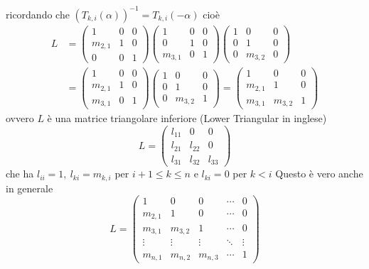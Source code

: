 \documentclass[12pt,a4paper]{article}
\begin{document}
    ricordando che $(T_{k,i} (\alpha))^{-1} = T_{k, i} (-\alpha)$ cioè
    \[
    \begin{split}
        L &=
        \begin{pmatrix}
        1 & 0 & 0 \\
        m_{2,1} & 1 & 0 \\
        0 & 0 & 1
        \end{pmatrix}
        \begin{pmatrix}
        1 & 0 & 0 \\
        0 & 1 & 0 \\
        m_{3,1} & 0 & 1
        \end{pmatrix}
        \begin{pmatrix}
        1 & 0 & 0 \\
        0 & 1 & 0 \\
        0 & m_{3,2} & 0
        \end{pmatrix} \\
        &=
        \begin{pmatrix}
        1 & 0 & 0 \\
        m_{2,1} & 1 & 0 \\
        m_{3,1} & 0 & 1
        \end{pmatrix}
        \begin{pmatrix}
        1 & 0 & 0 \\
        0 & 1 & 0 \\
        0 & m_{3,2} & 1
        \end{pmatrix}
        =
        \begin{pmatrix}
        1 & 0 & 0 \\
        m_{2,1} & 1 & 0 \\
        m_{3,1} & m_{3,2} & 1
        \end{pmatrix}
    \end{split}
    \]
    ovvero $L$ è una matrice triangolare inferiore (Lower Triangular in inglese)
    \[
    L =
    \begin{pmatrix}
    l_{11} & 0 & 0 \\
    l_{21} & l_{22} & 0 \\
    l_{31} & l_{32} & l_{33}
    \end{pmatrix}
    \]
    che ha $l_{ii} = 1, \ l_{ki} = m_{k,i}$ per $i+1 \le k \le n$ e $l_{ki} = 0$ per $k<i$
Questo è vero anche in generale
\[
L=
\begin{pmatrix}
1 & 0 & 0 & \cdots & 0 \\
m_{2,1} & 1 & 0 & \cdots & 0 \\
m_{3,1} & m_{3,2} & 1 & \cdots & 0 \\
\vdots & \vdots & \vdots & \ddots & \vdots \\
m_{n,1} & m_{n,2} & m_{n,3} & \cdots & 1
\end{pmatrix}
\]
\end{document}
